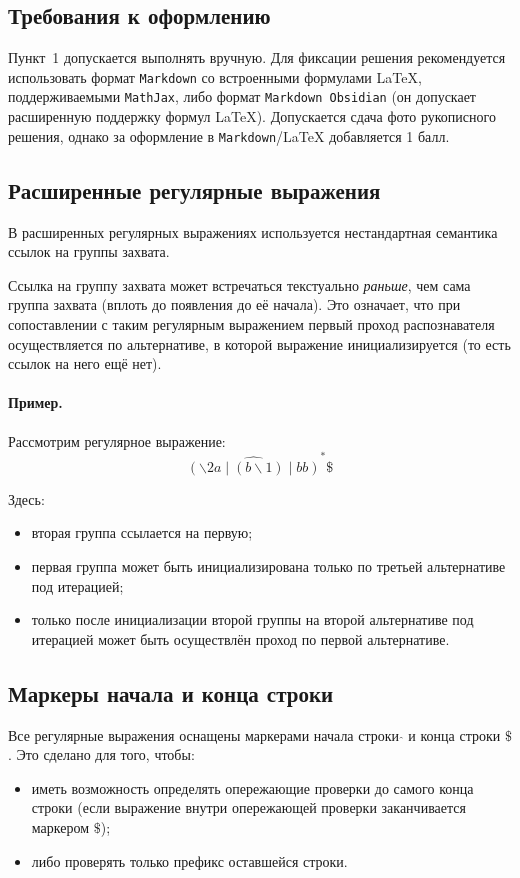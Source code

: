 \documentclass[a4paper,12pt]{article}
\begin{document}
\subsection*{Требования к оформлению}

Пункт~1 допускается выполнять вручную. Для фиксации решения рекомендуется использовать формат \texttt{Markdown} со встроенными формулами \LaTeX{}, поддерживаемыми \texttt{MathJax}, либо формат \texttt{Markdown Obsidian} (он допускает расширенную поддержку формул \LaTeX{}). Допускается сдача фото рукописного решения, однако за оформление в \texttt{Markdown}/\LaTeX{} добавляется 1 балл.

\subsection*{Расширенные регулярные выражения}

В расширенных регулярных выражениях используется нестандартная семантика ссылок на группы захвата.

Ссылка на группу захвата может встречаться текстуально \emph{раньше}, чем сама группа захвата (вплоть до появления до её начала). Это означает, что при сопоставлении с таким регулярным выражением первый проход распознавателя осуществляется по альтернативе, в которой выражение инициализируется (то есть ссылок на него ещё нет).

\paragraph{Пример.}

Рассмотрим регулярное выражение:
\[
\hat{(\backslash 2 a \mid (b\backslash 1) \mid bb)}^{*}\$
\]

Здесь:
\begin{itemize}
    \item вторая группа ссылается на первую;
    \item первая группа может быть инициализирована только по третьей альтернативе под итерацией;
    \item только после инициализации второй группы на второй альтернативе под итерацией может быть осуществлён проход по первой альтернативе.
\end{itemize}

\subsection*{Маркеры начала и конца строки}

Все регулярные выражения оснащены маркерами начала строки \( \hat{} \) и конца строки \( \$ \). Это сделано для того, чтобы:
\begin{itemize}
    \item иметь возможность определять опережающие проверки до самого конца строки (если выражение внутри опережающей проверки заканчивается маркером \( \$ \));
    \item либо проверять только префикс оставшейся строки.
\end{itemize}
\end{document}
